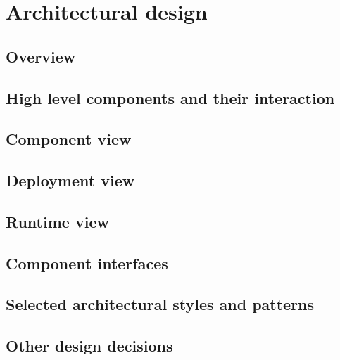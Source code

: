 \chapter{Architectural design}


\section{Overview}
\lipsum[1]


\section{High level components and their interaction}
\lipsum[2]


\section{Component view}
\lipsum[3]


\section{Deployment view}
\lipsum[4]


\section{Runtime view}
\lipsum[5]


\section{Component interfaces}
\lipsum[6]


\section{Selected architectural styles and patterns}
\lipsum[7]


\section{Other design decisions}
\lipsum[8]
